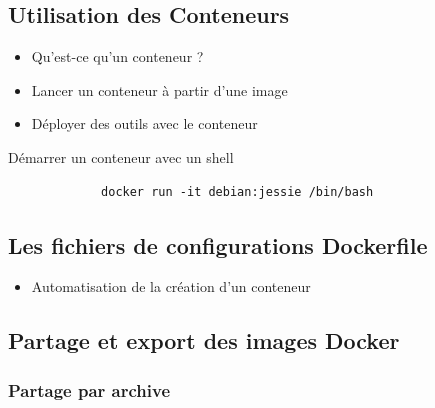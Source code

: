 \documentclass{beamer}
\begin{document}
    \subsection{Utilisation des Conteneurs}
    \begin{frame}[containsverbatim]
       \begin{itemize}
          \item{Qu'est-ce qu'un conteneur ?}
          \item{Lancer un conteneur à partir d'une image}
          \item{Déployer des outils avec le conteneur}
       \end{itemize}
     
       \begin{exampleblock}{Démarrer un conteneur avec un shell}
          \begin{verbatim}
             docker run -it debian:jessie /bin/bash
          \end{verbatim}
       \end{exampleblock}
    \end{frame}

    \subsection{Les fichiers de configurations Dockerfile}
    \begin{frame}
       \begin{itemize}
          \item{Automatisation de la création d'un conteneur}
          
       \end{itemize}
    \end{frame}

    \subsection{Partage et export des images Docker}
    \begin{frame}
       \begin{itemize}
       \end{itemize}
    \end{frame}

    \subsubsection{Partage par archive}
    \begin{frame}
    \end{frame}
\end{document}
